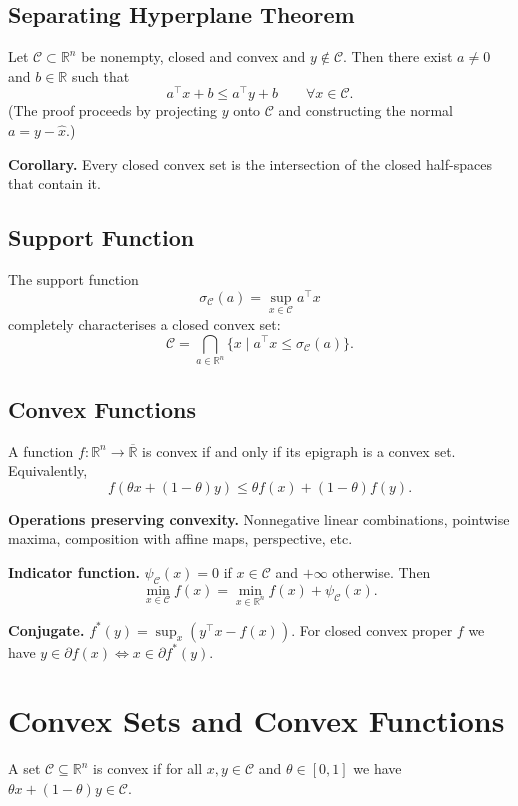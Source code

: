 \subsection{Separating Hyperplane Theorem}
Let \(\mathcal{C}\subset\mathbb{R}^n\) be nonempty, closed and convex
and \(y\notin\mathcal{C}\). Then there exist \(a\neq 0\) and
\(b\in\mathbb{R}\) such that
\[
a^\top x+b\le a^\top y+b\qquad\forall x\in\mathcal{C}.
\]
(The proof proceeds by projecting \(y\) onto \(\mathcal{C}\) and
constructing the normal \(a=y-\hat{x}\).)

\textbf{Corollary.} Every closed convex set is the intersection of
the closed half-spaces that contain it.

\subsection{Support Function}
The support function
\[
\sigma_{\mathcal{C}}(a)=\sup_{x\in\mathcal{C}}a^\top x
\]
completely characterises a closed convex set:
\[
\mathcal{C}=\bigcap_{a\in\mathbb{R}^n}\{x\mid a^\top
x\le\sigma_{\mathcal{C}}(a)\}.
\]

\subsection{Convex Functions}
A function \(f:\mathbb{R}^n\to\overline{\mathbb{R}}\) is convex if
and only if its epigraph is a convex set. Equivalently,
\[
f(\theta x+(1-\theta)y)\le\theta f(x)+(1-\theta)f(y).
\]

\textbf{Operations preserving convexity.} Nonnegative linear
combinations, pointwise maxima, composition with affine maps, perspective, etc.

\textbf{Indicator function.} \(\psi_{\mathcal{C}}(x)=0\) if
\(x\in\mathcal{C}\) and \(+\infty\) otherwise. Then
\[
\min_{x\in\mathcal{C}}f(x)=\min_{x\in\mathbb{R}^n}f(x)+\psi_{\mathcal{C}}(x).
\]

\textbf{Conjugate.} \(f^*(y)=\sup_x(y^\top x-f(x))\). For closed
convex proper \(f\) we have \(y\in\partial f(x)\iff x\in\partial f^*(y)\).

\section{Convex Sets and Convex Functions}

\begin{definition}
A set $\mathcal{C}\subseteq\mathbb{R}^n$ is convex if for all
$x,y\in\mathcal{C}$ and $\theta\in[0,1]$ we have $\theta
x+(1-\theta)y\in\mathcal{C}$.
\end{definition}

